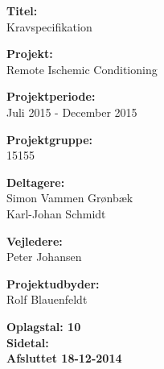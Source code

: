 \begin{minipage}[t]{0.48\textwidth}
\textbf{Titel:} \\[5pt]\bigskip\hspace{2ex}
Kravspecifikation

\textbf{Projekt:} \\[5pt]\bigskip\hspace{2ex}
Remote Ischemic Conditioning

\textbf{Projektperiode:} \\[5pt]\bigskip\hspace{2ex}
Juli 2015 - December 2015

\textbf{Projektgruppe:} \\[5pt]\bigskip\hspace{2ex}
15155

\textbf{Deltagere:} \\[5pt]\hspace*{2ex}
Simon Vammen Grønbæk\\\hspace*{2ex}
Karl-Johan Schmidt \\\hspace*{2ex}


\textbf{Vejledere:} \\[5pt]\hspace*{2ex}
Peter Johansen \\\bigskip\hspace{2ex}

\textbf{Projektudbyder:} \\[5pt]\hspace*{2ex}
Rolf Blauenfeldt\\\bigskip\hspace{2ex}
\vspace*{4cm}

\textbf{Oplagstal: 10} \\
\textbf{Sidetal: \pageref{LastPage}} \\
\textbf{Afsluttet 18-12-2014}

\end{minipage}
\hfill
